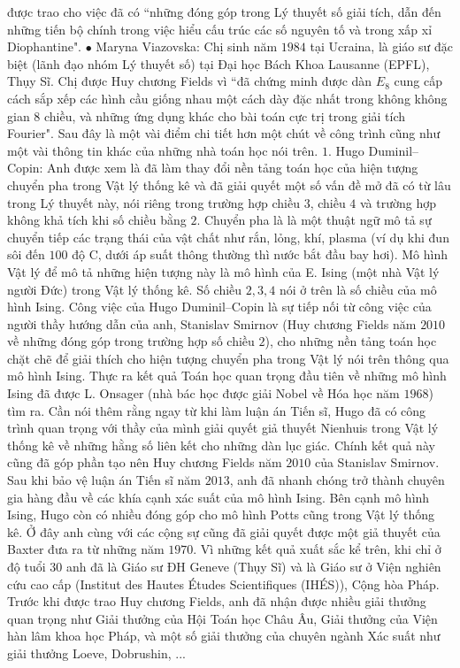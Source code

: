 	\begin{multicols}{2} 
	được trao cho việc đã có ``những đóng góp trong Lý thuyết số giải tích, dẫn đến những tiến bộ chính trong việc hiểu cấu trúc các số nguyên tố và trong xấp xỉ Diophantine". 
	\vskip 0.1cm
	$\bullet$ Maryna Viazovska: Chị sinh năm $1984$ tại Ucraina, là giáo sư đặc biệt (lãnh đạo nhóm Lý thuyết số) tại Đại học Bách Khoa Lausanne (EPFL), Thụy Sĩ. Chị được Huy chương Fields vì ``đã chứng minh được dàn $E_{8}$ cung cấp cách sắp xếp các hình cầu giống nhau một cách dày đặc nhất trong không không gian $8$ chiều, và những ứng dụng khác cho bài toán cực trị trong giải tích Fourier".
	\vskip 0.1cm
	Sau đây là một vài điểm chi tiết hơn một chút về công trình cũng như một vài thông tin khác của những nhà toán học nói trên. 
	\vskip 0.1cm
	$1.$ Hugo Duminil--Copin: Anh được xem là đã làm thay đổi nền tảng toán học của hiện tượng chuyển pha trong Vật lý thống kê và đã giải quyết một số vấn đề mở đã có từ lâu trong Lý thuyết này, nói riêng trong trường hợp chiều $3$, chiều $4$ và trường hợp không khả tích khi số chiều bằng $2$. Chuyển pha là là một thuật ngữ mô tả sự chuyển tiếp các trạng thái của vật chất như rắn, lỏng, khí, plasma (ví dụ khi đun sôi đến $100$ độ C, dưới áp suất thông thường thì nước bắt đầu bay hơi). Mô hình Vật lý để mô tả những hiện tượng này là mô hình của E. Ising (một nhà Vật lý người Đức) trong Vật lý thống kê. Số chiều $2,3,4$ nói ở trên là số chiều của mô hình Ising. Công việc của Hugo Duminil--Copin là sự tiếp nối từ công việc của người thầy hướng dẫn của anh, Stanislav Smirnov (Huy chương Fields năm $2010$ về những đóng góp trong trường hợp số chiều $2$), cho những nền tảng toán học chặt chẽ để giải thích cho hiện tượng chuyển pha trong Vật lý nói trên thông qua mô hình Ising. Thực ra kết quả Toán học quan trọng đầu tiên về những mô hình Ising đã được L. Onsager (nhà bác học được giải Nobel về Hóa học năm $1968$) tìm ra. 
	\vskip 0.1cm
	Cần nói thêm rằng ngay từ khi làm luận án Tiến sĩ, Hugo đã có công trình quan trọng với thầy của mình giải quyết giả thuyết Nienhuis trong Vật lý thống kê về những hằng số liên kết cho những dàn lục giác. Chính kết quả này cũng đã góp phần tạo nên Huy chương Fields năm $2010$ của Stanislav Smirnov. Sau khi bảo vệ luận án Tiến sĩ năm $2013$, anh đã nhanh chóng trở thành chuyên gia hàng đầu về các khía cạnh xác suất của mô hình Ising. Bên cạnh mô hình Ising, Hugo còn có nhiều đóng góp cho mô hình Potts cũng trong Vật lý thống kê. Ở đây anh cùng với các cộng sự cũng đã giải quyết được một giả thuyết của Baxter đưa ra từ những năm $1970$. Vì những kết quả xuất sắc kể trên, khi chỉ ở độ tuổi $30$ anh đã là Giáo sư ĐH Geneve (Thụy Sĩ) và là Giáo sư ở Viện nghiên cứu cao cấp (Institut des Hautes Études Scientifiques (IHÉS)), Cộng hòa Pháp. Trước khi được trao Huy chương Fields, anh đã nhận được nhiều giải thưởng quan trọng như Giải thưởng của Hội Toán học Châu Âu, Giải thưởng của Viện hàn lâm khoa học Pháp, và một số giải thưởng của chuyên ngành Xác suất như giải thưởng Loeve, Dobrushin, ...  

\end{multicols}
